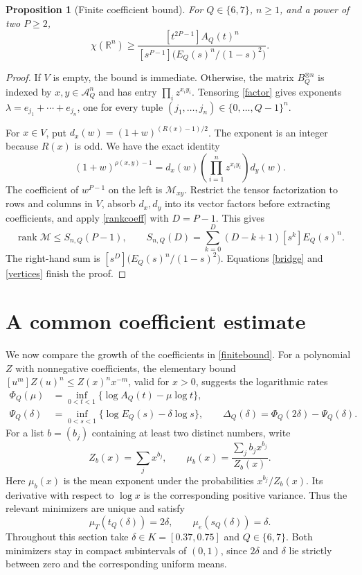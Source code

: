 \documentclass[12pt,a4paper]{article}
\newtheorem{proposition}[theorem]{Proposition}
\newcommand{\R}{\mathbb R}
\newcommand{\rank}{\operatorname{rank}}
\begin{document}
\begin{proposition}[Finite coefficient bound]\label{finite}
For $Q\in\{6,7\}$, $n\ge1$, and a power of two $P\ge2$,
\begin{equation}\label{finitebound}
\chi(\R^n)\ge
\frac{[t^{2P-1}]A_Q(t)^n}
{[s^{P-1}]\bigl(E_Q(s)^n/(1-s)^2\bigr)}.
\end{equation}
\end{proposition}
\begin{proof}
If $V$ is empty, the bound is immediate. Otherwise, the matrix $B_Q^{\otimes n}$ is indexed by $x,y\in\mathcal A_Q^n$ and has entry $\prod_i z^{x_i y_i}$. Tensoring \eqref{factor} gives exponents
$\lambda=e_{j_1}+\cdots+e_{j_n}$, one for every tuple $(j_1,\ldots,j_n)\in\{0,\ldots,Q-1\}^n$.

For $x\in V$, put $d_x(w)=(1+w)^{(R(x)-1)/2}$. The exponent is an integer because $R(x)$ is odd. We have the exact identity
\begin{equation}\label{rowfactors}
(1+w)^{\rho(x,y)-1}
=d_x(w)\left(\prod_{i=1}^n z^{x_i y_i}\right)d_y(w).
\end{equation}
The coefficient of $w^{P-1}$ on the left is $\mathcal M_{xy}$. Restrict the tensor factorization to rows and columns in $V$, absorb $d_x,d_y$ into its vector factors before extracting coefficients, and apply \eqref{rankcoeff} with $D=P-1$. This gives
\begin{equation}\label{weighted}
\rank\mathcal M\le S_{n,Q}(P-1),\qquad
S_{n,Q}(D)=\sum_{k=0}^D(D-k+1)[s^k]E_Q(s)^n.
\end{equation}
The right-hand sum is $[s^D]\bigl(E_Q(s)^n/(1-s)^2\bigr)$. Equations \eqref{bridge} and \eqref{vertices} finish the proof.
\end{proof}

\section{A common coefficient estimate}\label{counting}
We now compare the growth of the coefficients in \eqref{finitebound}. For a polynomial $Z$ with nonnegative coefficients, the elementary bound $[u^m]Z(u)^n\le Z(x)^n x^{-m}$, valid for $x>0$, suggests the logarithmic rates
\begin{align}
\Phi_Q(\mu)&=\inf_{0<t<1}\{\log A_Q(t)-\mu\log t\},\nonumber\\
\Psi_Q(\delta)&=\inf_{0<s<1}\{\log E_Q(s)-\delta\log s\},\qquad
\Delta_Q(\delta)=\Phi_Q(2\delta)-\Psi_Q(\delta).\label{rates}
\end{align}
For a list $b=(b_j)$ containing at least two distinct numbers, write
\[
Z_b(x)=\sum_jx^{b_j},\qquad
\mu_b(x)=\frac{\sum_jb_jx^{b_j}}{Z_b(x)}.
\]
Here $\mu_b(x)$ is the mean exponent under the probabilities $x^{b_j}/Z_b(x)$. Its derivative with respect to $\log x$ is the corresponding positive variance. Thus the relevant minimizers are unique and satisfy
\begin{equation}\label{means}
\mu_T(t_Q(\delta))=2\delta,\qquad
\mu_e(s_Q(\delta))=\delta.
\end{equation}
Throughout this section take $\delta\in K=[0.37,0.75]$ and $Q\in\{6,7\}$. Both minimizers stay in compact subintervals of $(0,1)$, since $2\delta$ and $\delta$ lie strictly between zero and the corresponding uniform means.
\end{document}

